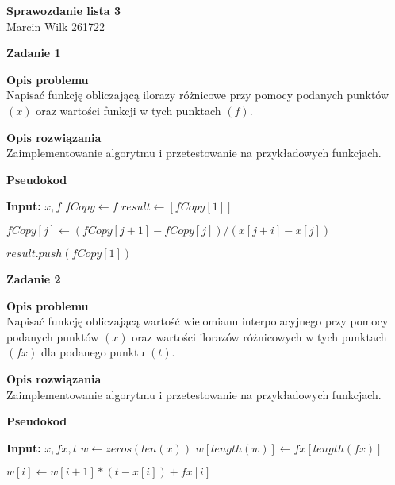 \documentclass{article}
\begin{document}
\begin{center}
	\textbf{\LARGE Sprawozdanie lista 3} \\
	{\large Marcin Wilk 261722} \\

\end{center}

\noindent \textbf{\large Zadanie 1}

\noindent \textbf{Opis problemu} \\
Napisać funkcję obliczającą ilorazy różnicowe przy pomocy podanych
punktów $(x)$ oraz wartości funkcji w tych punktach $(f)$.

\noindent \textbf{Opis rozwiązania} \\
Zaimplementowanie algorytmu i przetestowanie na przykładowych funkcjach.

\noindent \textbf{Pseudokod}

\begin{algorithmic}
	\State \textbf{Input:} $x, f$
	\State $fCopy \gets f$
	\State $result \gets [fCopy[1]]$



	\State $fCopy[j] \gets (fCopy[j+1] - fCopy[j]) / (x[j+i] - x[j])$

	$result.push(fCopy[1])$

	\EndFor

	\State {}

	\EndFor
\end{algorithmic}

\noindent \textbf{\large Zadanie 2}

\noindent \textbf{Opis problemu} \\
Napisać funkcję obliczającą wartość wielomianu interpolacyjnego przy pomocy
podanych punktów $(x)$ oraz wartości ilorazów różnicowych w tych punktach $(fx)$
dla podanego punktu $(t)$.

\noindent \textbf{Opis rozwiązania} \\
Zaimplementowanie algorytmu i przetestowanie na przykładowych funkcjach.

\noindent \textbf{Pseudokod}
\begin{algorithmic}
	\State \textbf{Input:} $x, fx, t$
	\State $w \gets zeros(len(x))$
	\State $w[length(w)] \gets fx[length(fx)]$

	\State $w[i] \gets w[i+1] * (t - x[i]) + fx[i]$
	\EndFor

	\State {}

\end{algorithmic}
\end{document}
